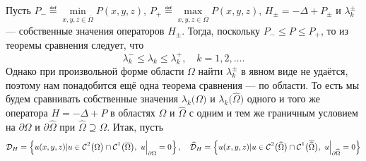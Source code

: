 Пусть $\displaystyle P_{-}\eqdef\min\limits_{x,y,z\in\overline{\Omega}}P(x,y,z)$, $\displaystyle P_{+}\eqdef\max\limits_{x,y,z\in\overline{\Omega}}P(x,y,z)$, $\displaystyle H_{\pm}=-\Delta+ P_{\pm}$  и $\lambda_k^{\pm}$ --- собственные значения операторов $H_{\pm}$. Тогда, поскольку $P_{-}\leqslant P\leqslant P_{+}$, то из теоремы сравнения следует, что
\begin{equation}\label{l10:eq:12a}
	\lambda_k^{-}\leqslant\lambda_k\leqslant\lambda_k^{+},\quad k=1,2,\ldots.
\end{equation} 
Однако при произвольной форме области $\Omega$ найти $\lambda_k^{\pm}$ в явном виде не удаётся, поэтому нам понадобится ещё одна теорема сравнения --- по области. То есть мы будем сравнивать собственные значения $\lambda_k\big(\Omega\big)$ и $\lambda_k\big(\widehat{\Omega}\big)$ одного и того же оператора $H=-\Delta+P$ в областях $\Omega$ и $\widehat{\Omega}$ с одним и тем же граничным условием на $\partial\Omega$ и $\partial\widehat{\Omega}$ при $\widehat{\Omega}\supseteq\Omega$. Итак, пусть
\begin{equation*}
	\hfill\mc{D}_{H}=\left\{u(x,y,z)|u\in\Cfn{2}\big(\Omega\big)\cap\Cfn{1}\big(\overline{\Omega}\big),\ u\Big|_{\partial\Omega}=0\right\},\quad\widehat{\mc{D}}_{H}=\left\{u(x,y,z)|u\in\Cfn{2}\big(\widehat{\Omega}\big)\cap\Cfn{1}\big(\overline{\widehat{\Omega}}\big),\ u\Big|_{\partial\widehat{\Omega}}=0\right\}
\end{equation*}  
